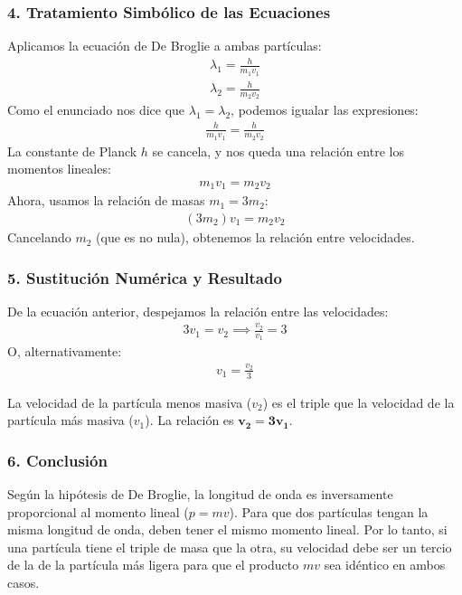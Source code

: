 \subsubsection*{4. Tratamiento Simbólico de las Ecuaciones}
Aplicamos la ecuación de De Broglie a ambas partículas:
\begin{gather}
    \lambda_1 = \frac{h}{m_1 v_1} \\
    \lambda_2 = \frac{h}{m_2 v_2}
\end{gather}
Como el enunciado nos dice que $\lambda_1 = \lambda_2$, podemos igualar las expresiones:
\begin{gather}
    \frac{h}{m_1 v_1} = \frac{h}{m_2 v_2}
\end{gather}
La constante de Planck $h$ se cancela, y nos queda una relación entre los momentos lineales:
\begin{gather}
    m_1 v_1 = m_2 v_2
\end{gather}
Ahora, usamos la relación de masas $m_1 = 3m_2$:
\begin{gather}
    (3 m_2) v_1 = m_2 v_2
\end{gather}
Cancelando $m_2$ (que es no nula), obtenemos la relación entre velocidades.

\subsubsection*{5. Sustitución Numérica y Resultado}
De la ecuación anterior, despejamos la relación entre las velocidades:
\begin{gather}
    3 v_1 = v_2 \implies \frac{v_2}{v_1} = 3
\end{gather}
O, alternativamente:
\begin{gather}
    v_1 = \frac{v_2}{3}
\end{gather}
\begin{cajaresultado}
    La velocidad de la partícula menos masiva ($v_2$) es el triple que la velocidad de la partícula más masiva ($v_1$). La relación es $\boldsymbol{v_2 = 3v_1}$.
\end{cajaresultado}

\subsubsection*{6. Conclusión}
\begin{cajaconclusion}
    Según la hipótesis de De Broglie, la longitud de onda es inversamente proporcional al momento lineal ($p=mv$). Para que dos partículas tengan la misma longitud de onda, deben tener el mismo momento lineal. Por lo tanto, si una partícula tiene el triple de masa que la otra, su velocidad debe ser un tercio de la de la partícula más ligera para que el producto $mv$ sea idéntico en ambos casos.
\end{cajaconclusion}

